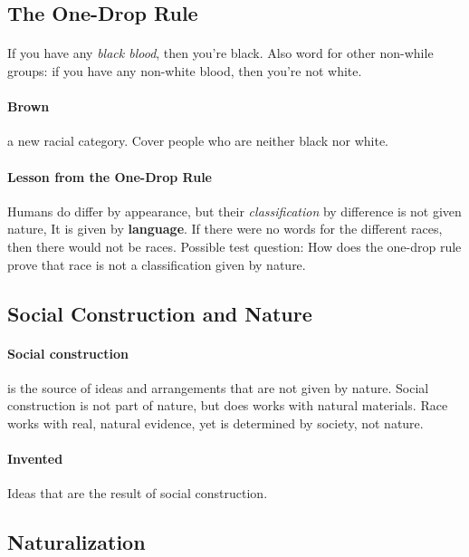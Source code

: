 \documentclass{article}
\begin{document}
	\subsection{The One-Drop Rule}
	\paragraph{} If you have any \emph{black blood}, then you're black.
	\newline Also word for other non-while groups: if you have any non-white blood, then you're not white.

	\paragraph{Brown} a new racial category. Cover people who are neither black nor white.
	\paragraph{Lesson from the One-Drop Rule} Humans do differ by appearance, but their \emph{classification} by difference is not given nature,
	\newline It is given by \textbf{language}.
	\newline If there were no words for the different races, then there would not be races.
	\newline Possible test question: How does the one-drop rule prove that race is not a classification given by nature.

	\subsection{Social Construction and Nature}
	\paragraph{Social construction} is the source of ideas and arrangements that are not given by nature.
	\newline Social construction is not part of nature, but does works with natural materials. Race works with real, natural evidence, yet is determined by society, not nature.

	\paragraph{Invented} Ideas that are the result of social construction.

	\subsection{Naturalization}
\end{document}
